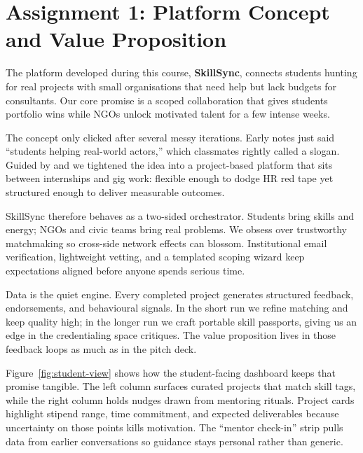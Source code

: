 \section*{Assignment 1: Platform Concept and Value Proposition}

The platform developed during this course, \textbf{SkillSync}, connects students hunting for real projects with small organisations that need help but lack budgets for consultants. Our core promise is a scoped collaboration that gives students portfolio wins while NGOs unlock motivated talent for a few intense weeks.

The concept only clicked after several messy iterations. Early notes just said ``students helping real-world actors,'' which classmates rightly called a slogan. Guided by \citet{Choudary2016} and \citet{Srnicek2017} we tightened the idea into a project-based platform that sits between internships and gig work: flexible enough to dodge HR red tape yet structured enough to deliver measurable outcomes.

SkillSync therefore behaves as a two-sided orchestrator. Students bring skills and energy; NGOs and civic teams bring real problems. We obsess over trustworthy matchmaking so cross-side network effects can blossom. Institutional email verification, lightweight vetting, and a templated scoping wizard keep expectations aligned before anyone spends serious time.

Data is the quiet engine. Every completed project generates structured feedback, endorsements, and behavioural signals. In the short run we refine matching and keep quality high; in the longer run we craft portable skill passports, giving us an edge in the credentialing space \citet{Zuboff2019} critiques. The value proposition lives in those feedback loops as much as in the pitch deck.

Figure~\ref{fig:student-view} shows how the student-facing dashboard keeps that promise tangible. The left column surfaces curated projects that match skill tags, while the right column holds nudges drawn from mentoring rituals. Project cards highlight stipend range, time commitment, and expected deliverables because uncertainty on those points kills motivation. The ``mentor check-in'' strip pulls data from earlier conversations so guidance stays personal rather than generic.


